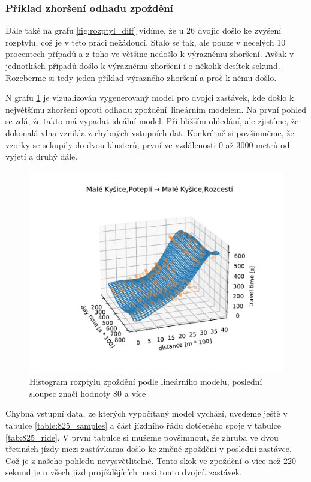 \subsubsection{Příklad zhoršení odhadu zpoždění}


Dále také na grafu \ref{fig:rozptyl_diff} vidíme, že u 26 dvojic došlo ke zvýšení rozptylu, což je v této práci nežádoucí. Stalo se tak, ale pouze v necelých 10 procentech případů a z toho ve většine nedošlo k výraznému zhoršení. Avšak v jednotkách případů došlo k výraznému zhoršení i o několik desítek sekund. Rozeberme si tedy jeden příklad výrazného zhoršení a proč k němu došlo.

\bigbreak

N grafu \ref{fig:chyba} je vizualizován vygenerovaný model pro dvojci zastávek, kde došlo k největšímu zhoršení oproti odhadu zpoždění lineárním modelem. Na první pohled se zdá, že takto má vypadat ideální model. Při bližším ohledání, ale zjistíme, že dokonalá vlna vznikla z chybných vstupních dat. Konkrétně si povšimněme, že vzorky se sekupily do dvou klusterů, první ve vzdálenosti 0 až 3000 metrů od vyjetí a druhý dále.

\begin{figure}
	\centering
  \includegraphics[width=1\linewidth]{../img/chyba}
  \caption{Histogram rozptylu zpoždění podle lineárního modelu, poslední sloupec značí hodnoty 80 a více}
  \label{fig:chyba}
\end{figure}

Chybná vstupní data, ze kterých vypočítaný model vychází, uvedeme ještě v tabulce \ref{table:825_samples} a část jízdního řádu dotčeného spoje v tabulce \ref{tab:825_ride}. V první tabulce si můžeme povšimnout, že zhruba ve dvou třetinách jízdy mezi zastávkama došlo ke změně zpoždění v poslední zastávce. Což je z našeho pohledu nevysvětlitelné. Tento skok ve zpoždění o více než 220 sekund je u všech jízd projíždějících mezi touto dvojcí. zastávek.

